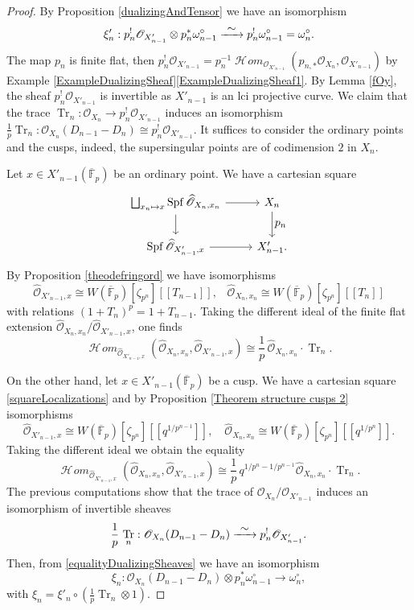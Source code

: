 \documentclass[11pt]{article}
\newcommand\mto{\mathchoice{\longmapsto}{\mapsto}{\mapsto}{\mapsto}}
\newcommand\To[1]{\mathchoice{\xrightarrow{\textstyle\kern4pt#1\kern3pt}}{\stackrel{#1}{\to}}{}{}}
\let\ts\textstyle
\newcommand{\lcr}{[\![}
\newcommand{\rcr}{]\!]}
\numberwithin{equation}{section}
\theoremstyle{definition}
\newcommand{\bb}[1]{\mathbb{#1}}
\newcommand{\s}[1]{\mathscr{#1}}
\DeclareMathOperator{\Tr}{Tr}
\DeclareMathOperator{\Spf}{Spf}
\DeclareMathOperator{\sHom}{\s{H}\!\mathit{om}}
\begin{document}
\begin{proof}
By Proposition \ref{dualizingAndTensor} we have an isomorphism
\begin{equation}
\label{equalityDualizingSheaves}
\xi'_n: p^!_n\s{O}_{X'_{n-1}}\otimes p_n^* \omega^\circ_{n-1}\To{\sim} p_n^! \omega_{n-1}^\circ=\omega_{n}^\circ.
\end{equation}
The map $p_n$ is finite flat, then $p_n^!\s{O}_{X'_{n-1}}= p_n^{-1}\sHom_{\s{O}_{X'_{n-1}}}(p_{n,*} \s{O}_{X_n}, \s{O}_{X'_{n-1}})$ by Example \ref{ExampleDualizingSheaf}\eqref{ExampleDualizingSheaf1}. By Lemma \ref{fOy}, the sheaf $p_n^! \s{O}_{X'_{n-1}}$ is invertible as $X'_{n-1}$ is an lci projective curve. We claim that the trace $\Tr_n:\s{O}_{X_n}\to p_n^! \s{O}_{X'_{n-1}}$ induces an isomorphism $\frac{1}{p} \Tr_n: \s{O}_{X_n}(D_{n-1}-D_n)\cong p^!_n \s{O}_{X'_{n-1}}$. It suffices to consider the ordinary points and the cusps, indeed, the supersingular points are of codimension $2$ in $X_n$.

Let $x\in X'_{n-1}(\overline{\bb{F}}_p)$ be an ordinary point. We have a cartesian square
\begin{equation}
\label{squareLocalizations}
\begin{tikzcd}
\bigsqcup_{x_n\mto x} \Spf \widehat{\s{O}}_{X_n, x_n} \ar[r] \ar[d]& X_n\ar[d,"\ts p_n"] \\
\Spf \widehat{\s{O}}_{X'_{n-1},x} \ar[r]& X'_{n-1}.
\end{tikzcd}
\end{equation}
By Proposition \ref{theodefringord} we have isomorphisms
\[
\widehat{\s{O}}_{X'_{n-1},x}\cong W(\overline{\bb{F}}_p)[\zeta_{p^{n}}]\lcr T_{n-1}\rcr, \;\;\; \widehat{\s{O}}_{X_n,x_n}\cong W(\overline{\bb{F}}_p)[\zeta_{p^{n}}]\lcr T_{n}\rcr
\]
with relations $(1+T_n)^p=1+T_{n-1}$. Taking the different ideal of the finite flat extension $\widehat{\s{O}}_{X_n,x_n} / \widehat{\s{O}}_{X'_{n-1},x}$, one finds
\[
\sHom_{\widehat{\s{O}}_{X'_{n-1},x}}(\widehat{\s{O}}_{X_n,x_n},\widehat{\s{O}}_{X'_{n-1},x})\cong \frac{1}{p}\,\widehat{\s{O}}_{X_n,x_n}\cdot \Tr_{n} .
\]

On the other hand, let $x\in X'_{n-1}(\overline{\bb{F}}_p)$ be a cusp. We have a cartesian square \eqref{squareLocalizations} and by Proposition \ref{Theorem structure cusps 2} isomorphisms
\[
\widehat{\s{O}}_{X'_{n-1},x}\cong W(\overline{\bb{F}}_p)[\zeta_{p^{n}}]\lcr q^{1/p^{n-1}}\rcr, \quad \widehat{\s{O}}_{X_n,x_n}\cong W(\overline{\bb{F}}_p)[\zeta_{p^{n}}]\lcr q^{1/p^{n}}\rcr.
\]
Taking the different ideal we obtain the equality
\[
\sHom_{\widehat{\s{O}}_{X'_{n-1},x}}(\widehat{\s{O}}_{X_n,x_n},\widehat{\s{O}}_{X'_{n-1},x}) \cong \frac{1}{p}\, q^{1/p^n-1/p^{n-1}} \widehat{\s{O}}_{X_n,x_n}\cdot \Tr_n.
\]
The previous computations show that the trace of $\s{O}_{X_n}/\s{O}_{X'_{n-1}}$ induces an isomorphism of invertible sheaves
\[
\frac{1}{p}\, \Tr_n: \s{O}_{X_n}(D_{n-1}- D_n) \To{\sim} p_n^!\s{O}_{X'_{n-1}}.
\]
Then, from \eqref{equalityDualizingSheaves} we have an isomorphism
\[
\xi_{n}: \s{O}_{X_n}(D_{n-1}- D_n)\otimes p_n^*\omega^\circ_{n-1}\to \omega^\circ_n,
\]
with $\xi_n= \xi'_n\circ (\frac{1}{p} \Tr_n \otimes 1)$.


\end{proof}
\end{document}

